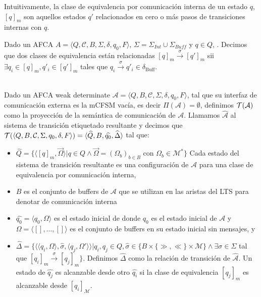 Intuitivamente, la clase de equivalencia por comunicación interna de un estado $q$, $[q]_m$ son aquellos estados $q'$ relacionados en cero o más pasos de transiciones internas con $q$.

Dado un AFCA $A = \langle Q, \mathcal{C}, B, \Sigma, \delta, q_0, F \rangle$, $\Sigma = \Sigma_\mathit{Int} \cup \Sigma_\mathit{Buff}$ y $q \in Q$, . Decimos que dos clases de equivalencia están relacionadas $[q]_m \xrightarrow{\sigma} [q']_m$ sii $\exists q_i \in [q]_m, q'_i \in [q']_m$ tales que $q_i \xrightarrow{\sigma} q'_i \in \delta_{\text{Buff}}$.

\begin{definition}\label{def:pci}\ \\
Dado un AFCA weak determinate $\mathcal{A} = \langle Q, B, \mathcal{C}, \Sigma, \delta, q_0, F \rangle$, tal que su interfaz de comunicación externa es la mCFSM vacía, es decir $\Pi(\mathcal{A}) = \emptyset$, definimos $\mathcal{T}(\mathcal{A})$ como la proyección de la semántica de comunicación de $\mathcal{A}$. Llamamos $\widehat{\mathcal{A}}$ al sistema de transición etiquetado resultante y decimos que $\mathcal{T} (\langle Q, B, \mathcal{C}, \Sigma, q_0, \delta, F \rangle)= \langle \widehat{Q}, B, \widehat{q_0}, \widehat{\Delta} \rangle$ tal que:
\begin{itemize}
    \item $ \widehat{Q} = \{ \langle [q]_m, \overrightarrow{\Omega} \rangle | q \in Q \land \overrightarrow{\Omega} = (\Omega_b)_{b \in B}$ con $\Omega_b \in \mathcal{M}^* \}$ Cada estado del sistema de transición resultante es una configuración de $\mathcal{A}$ para una clase de equivalencia por comunicación interna,
    \item $B$ es el conjunto de buffers de $\mathcal{A}$ que se utilizan en las aristas del LTS para denotar de comunicación interna
    \item $\widehat{q_0}= \langle q_0, \Omega \rangle$ es el estado inicial de  donde $q_0$ es el estado inicial de $\mathcal{A}$ y $\Omega = \langle [], \ldots, [] \rangle$ es el conjunto de buffers en su estado inicial sin mensajes, y
    \item $\widehat{\Delta}= \{\langle \langle q_i, \Omega \rangle, \widehat{\sigma},\langle q_j, \Omega' \rangle \rangle | q_i, q_j \in Q, \widehat{\sigma} \in \{B \times \{\gg, \ll\} \times \mathcal{M}\} \land \exists \sigma \in \Sigma$ tal que  $[q_i]_m \xrightarrow{\sigma} [q_j]_m \}$. Definimos $\widehat{\Delta}$ como la relación de transición de $\widehat{\mathcal{A}}$. Un estado de $\widehat{q_j}$ es alcanzable desde otro $\widehat{q_i}$ si la clase de equivalencia $[q_j]_m$ es alcanzable desde $[q_i]_\mathcal{M}$.
\end{itemize}
\end{definition}

